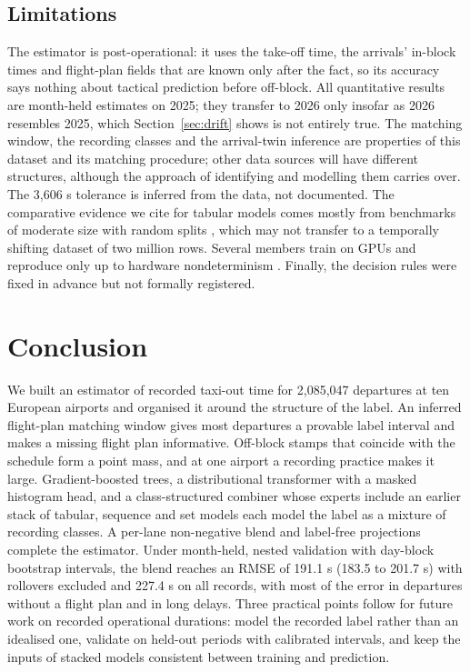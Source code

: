\documentclass[
  manuscript=article,  %
  layout=preprint,  %
  year=20xx,
  volume=x,
]{extra/joas}
\begin{document}
\subsection{Limitations}

The estimator is post-operational: it uses the take-off time, the arrivals' in-block times and flight-plan fields that are known only after the fact, so its accuracy says nothing about tactical prediction before off-block. All quantitative results are month-held estimates on 2025; they transfer to 2026 only insofar as 2026 resembles 2025, which Section~\ref{sec:drift} shows is not entirely true. The matching window, the recording classes and the arrival-twin inference are properties of this dataset and its matching procedure; other data sources will have different structures, although the approach of identifying and modelling them carries over. The 3,606 s tolerance is inferred from the data, not documented. The comparative evidence we cite for tabular models comes mostly from benchmarks of moderate size with random splits \cite{grinsztajn2022why,mcelfresh2023when,erickson2025tabarena}, which may not transfer to a temporally shifting dataset of two million rows. Several members train on GPUs and reproduce only up to hardware nondeterminism \cite{pham2020problems}. Finally, the decision rules were fixed in advance but not formally registered.


\section{Conclusion}
\label{sec:conclusion}

We built an estimator of recorded taxi-out time for 2,085,047 departures at ten European airports and organised it around the structure of the label. An inferred flight-plan matching window gives most departures a provable label interval and makes a missing flight plan informative. Off-block stamps that coincide with the schedule form a point mass, and at one airport a recording practice makes it large. Gradient-boosted trees, a distributional transformer with a masked histogram head, and a class-structured combiner whose experts include an earlier stack of tabular, sequence and set models each model the label as a mixture of recording classes. A per-lane non-negative blend and label-free projections complete the estimator. Under month-held, nested validation with day-block bootstrap intervals, the blend reaches an RMSE of 191.1 s (183.5 to 201.7 s) with rollovers excluded and 227.4 s on all records, with most of the error in departures without a flight plan and in long delays. Three practical points follow for future work on recorded operational durations: model the recorded label rather than an idealised one, validate on held-out periods with calibrated intervals, and keep the inputs of stacked models consistent between training and prediction.
\end{document}
